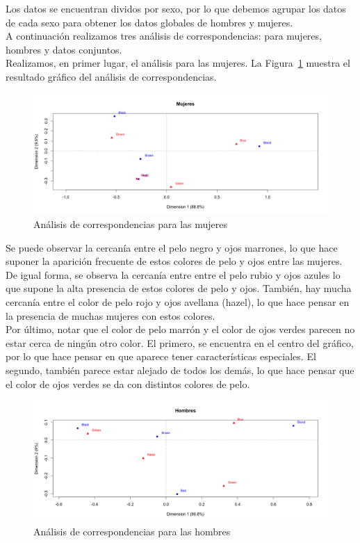 \documentclass[12pt,a4paper,twoside,openright,titlepage,final]{article}
\begin{document}
Los datos se encuentran dividos por sexo, por lo que debemos agrupar los datos de cada sexo para obtener los datos globales de hombres y mujeres.\\

A continuación realizamos tres análisis de correspondencias: para mujeres, hombres y datos conjuntos.\\

Realizamos, en primer lugar, el análisis para las mujeres. La Figura~\ref{fig:mujeres_ca} muestra el resultado gráfico del análisis de correspondencias.\\

\begin{figure}[tbph!]
\centering
\includegraphics[width=\linewidth]{imagenes/mujeres_ca}
\caption{Análisis de correspondencias para las mujeres}
\label{fig:mujeres_ca}
\end{figure}

Se puede observar la cercanía entre el pelo negro y ojos marrones, lo que hace suponer la aparición frecuente de estos colores de pelo y ojos entre las mujeres. De igual forma, se observa la cercanía entre entre el pelo rubio y ojos azules lo que supone la alta presencia de estos colores de pelo y ojos. También, hay mucha cercanía entre el color de pelo rojo y ojos avellana (hazel), lo que hace pensar en la presencia de muchas mujeres con estos colores.\\

Por último, notar que el color de pelo marrón y el color de ojos verdes parecen no estar cerca de ningún otro color. El primero, se encuentra en el centro del gráfico, por lo que hace pensar en que aparece tener características especiales. El segundo, también parece estar alejado de todos los demás, lo que hace pensar que el color de ojos verdes se da con distintos colores de pelo.\\

\begin{figure}[tbph!]
\centering
\includegraphics[width=\linewidth]{imagenes/hombres_ca}
\caption{Análisis de correspondencias para las hombres}
\label{fig:hombres_ca}
\end{figure}
\end{document}

